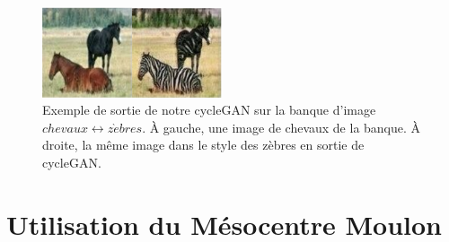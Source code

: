 \begin{figure}[!h]
\centering
\includegraphics[width=150pt]{"images/cycle/cycleRes3"}
\caption{Exemple de sortie de notre cycleGAN sur la banque d'image $chevaux \leftrightarrow z\grave{e}bres$. À gauche, une image de chevaux de la banque. À droite, la même image dans le style des zèbres en sortie de cycleGAN.}
\label{exemple_zebres}
\end{figure}

\section{Utilisation du Mésocentre Moulon}


